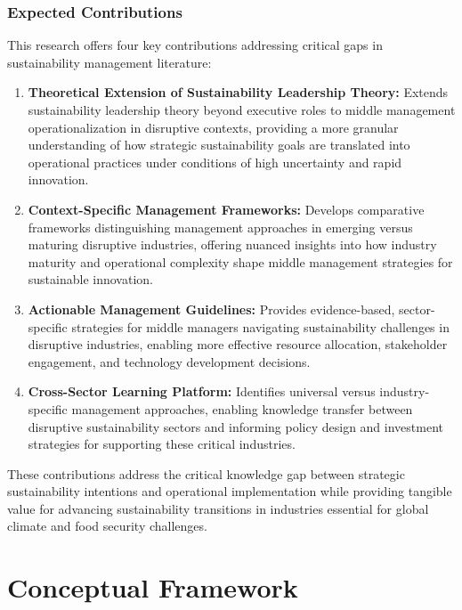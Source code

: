 	\subsubsection{Expected Contributions}
	This research offers four key contributions addressing critical gaps in sustainability management literature:
	\begin{enumerate}
		\item \textbf{Theoretical Extension of Sustainability Leadership Theory:} Extends sustainability leadership theory beyond executive roles to middle management operationalization in disruptive contexts, providing a more granular understanding of how strategic sustainability goals are translated into operational practices under conditions of high uncertainty and rapid innovation. \\
		\item \textbf{Context-Specific Management Frameworks:} Develops comparative frameworks distinguishing management approaches in emerging versus maturing disruptive industries, offering nuanced insights into how industry maturity and operational complexity shape middle management strategies for sustainable innovation. \\
		\item \textbf{Actionable Management Guidelines:} Provides evidence-based, sector-specific strategies for middle managers navigating sustainability challenges in disruptive industries, enabling more effective resource allocation, stakeholder engagement, and technology development decisions. \\
		\item \textbf{Cross-Sector Learning Platform:} Identifies universal versus industry-specific management approaches, enabling knowledge transfer between disruptive sustainability sectors and informing policy design and investment strategies for supporting these critical industries. \\
	\end{enumerate}
	These contributions address the critical knowledge gap between strategic sustainability intentions and operational implementation while providing tangible value for advancing sustainability transitions in industries essential for global climate and food security challenges. \\
	
\section*{Conceptual Framework}

